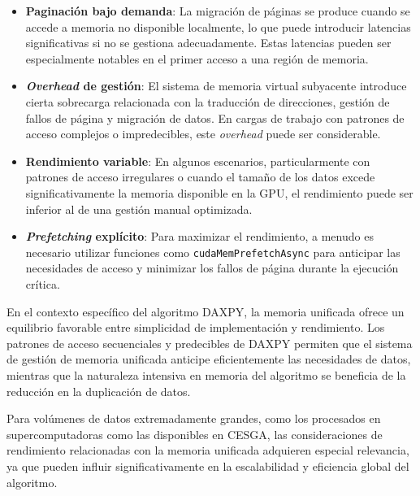         \begin{itemize}
        
            \item \textbf{Paginación bajo demanda}: La migración de páginas se produce cuando se accede a memoria no disponible localmente, lo que puede introducir latencias significativas si no se gestiona adecuadamente. Estas latencias pueden ser especialmente notables en el primer acceso a una región de memoria.
            
            \item \textbf{\textit{Overhead} de gestión}: El sistema de memoria virtual subyacente introduce cierta sobrecarga relacionada con la traducción de direcciones, gestión de fallos de página y migración de datos. En cargas de trabajo con patrones de acceso complejos o impredecibles, este \textit{overhead} puede ser considerable.
            
            \item \textbf{Rendimiento variable}: En algunos escenarios, particularmente con patrones de acceso irregulares o cuando el tamaño de los datos excede significativamente la memoria disponible en la GPU, el rendimiento puede ser inferior al de una gestión manual optimizada.
            
            \item \textbf{\textit{Prefetching} explícito}: Para maximizar el rendimiento, a menudo es necesario utilizar funciones como \texttt{cudaMemPrefetchAsync} para anticipar las necesidades de acceso y minimizar los fallos de página durante la ejecución crítica.
            
        \end{itemize}
    
        En el contexto específico del algoritmo DAXPY, la memoria unificada ofrece un equilibrio favorable entre simplicidad de implementación y rendimiento. Los patrones de acceso secuenciales y predecibles de DAXPY permiten que el sistema de gestión de memoria unificada anticipe eficientemente las necesidades de datos, mientras que la naturaleza intensiva en memoria del algoritmo se beneficia de la reducción en la duplicación de datos.
        
        Para volúmenes de datos extremadamente grandes, como los procesados en supercomputadoras como las disponibles en CESGA, las consideraciones de rendimiento relacionadas con la memoria unificada adquieren especial relevancia, ya que pueden influir significativamente en la escalabilidad y eficiencia global del algoritmo.

